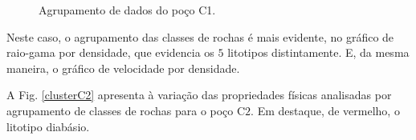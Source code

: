 \begin{figure}[H]
	\centering
	\setlength{\fboxsep}{8pt}
	\setlength{\fboxrule}{0.1pt}
	\caption{Agrupamento de dados do poço C1.}
	\label{clusterC1}
\end{figure} 

Neste caso, o agrupamento das classes de rochas é mais evidente, no gráfico de raio-gama por densidade, que evidencia os $5$ litotipos distintamente. E, da mesma maneira, o gráfico de velocidade por densidade.


A Fig. \ref{clusterC2} apresenta à variação das propriedades físicas analisadas por agrupamento de classes de rochas para o poço C$2$. Em destaque, de vermelho, o litotipo diabásio. 

